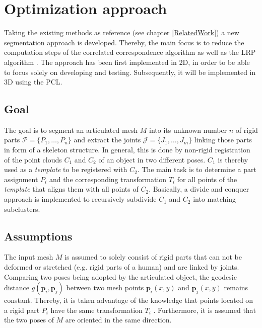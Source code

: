 \chapter{Optimization approach}
\label{cha:TheThesis}

Taking the existing methods as reference (see chapter \ref{RelatedWork}) a new segmentation approach is developed. Thereby, the main focus is to reduce the computation steps of the correlated correspondence algorithm \cite{CorrelatedCorrespondance} as well as the LRP algorithm \cite {guo2016correspondence}. The approach has been first implemented in 2D, in order to be able to focus solely on developing and testing. Subsequently, it will be implemented in 3D using the PCL.

\section{Goal}

The goal is to segment an articulated mesh $M$ into its unknown number $n$ of rigid parts $\mathcal{P} =  \{P_1,\ldots,P_n\}$ and extract the joints $\mathcal{J} =  \{J_1,\ldots,J_m\}$ linking those parts in form of a skeleton structure. In general, this is done by non-rigid registration of the point clouds $C_1$ and $C_2$ of an object in two different poses. $C_1$ is thereby used as a \textit{template} to be registered with $C_2$. The main task is to determine a part assignment $P_i$ and the corresponding transformation $T_i$ for all points of the \textit{template} that aligns them with all points of $C_2$. Basically, a divide and conquer approach is implemented to recursively subdivide $C_1$ and $C_2$ into matching subclusters. 

\section{Assumptions}

The input mesh $M$ is assumed to solely consist of rigid parts that can not be deformed or stretched (e.g. rigid parts of a human) and are linked by joints. Comparing two poses being adopted by the articulated object, the geodesic distance $g(\boldsymbol{p}_i,\boldsymbol{p}_j)$ between two mesh points $\boldsymbol{p}_i(x,y)$ and $\boldsymbol{p}_j(x,y)$ remains constant. Thereby, it is taken advantage of the knowledge that points located on a rigid part $P_i$ have the same transformation $T_i$ . Furthermore, it is assumed that the two poses of $M$ are oriented in the same direction.

